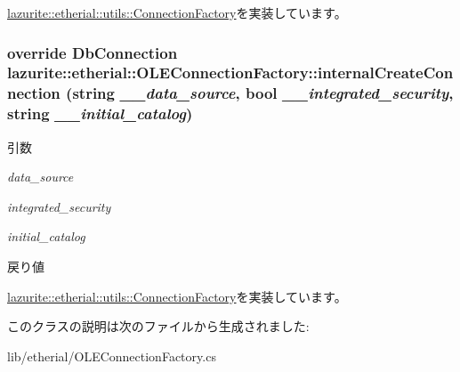 \hyperlink{classlazurite_1_1etherial_1_1utils_1_1_connection_factory_a21c31b431a87b330f8a7030140059861}{lazurite::etherial::utils::ConnectionFactory}を実装しています。\hypertarget{classlazurite_1_1etherial_1_1_o_l_e_connection_factory_a9c06016911fd6228fa86d6d458a82445}{
\subsubsection[{internalCreateConnection}]{\setlength{\rightskip}{0pt plus 5cm}override DbConnection lazurite::etherial::OLEConnectionFactory::internalCreateConnection (string {\em \_\-\_\-data\_\-source}, \/  bool {\em \_\-\_\-integrated\_\-security}, \/  string {\em \_\-\_\-initial\_\-catalog})}}
\label{classlazurite_1_1etherial_1_1_o_l_e_connection_factory_a9c06016911fd6228fa86d6d458a82445}

\begin{DoxyParams}{引数}
\item[{\em data\_\-source}]\item[{\em integrated\_\-security}]\item[{\em initial\_\-catalog}]\end{DoxyParams}
\begin{DoxyReturn}{戻り値}

\end{DoxyReturn}


\hyperlink{classlazurite_1_1etherial_1_1utils_1_1_connection_factory_adc19f91b5686f5a21af75a180bab6db3}{lazurite::etherial::utils::ConnectionFactory}を実装しています。

このクラスの説明は次のファイルから生成されました:\begin{DoxyCompactItemize}
\item 
lib/etherial/OLEConnectionFactory.cs\end{DoxyCompactItemize}
